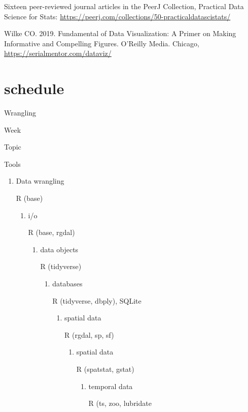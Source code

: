 \documentclass[
]{book}
\begin{document}
Sixteen peer-reviewed journal articles in the PeerJ Collection, Practical Data Science for Stats: \url{https://peerj.com/collections/50-practicaldatascistats/}

Wilke CO. 2019. Fundamental of Data Visualization: A Primer on Making Informative and Compelling Figures. O'Reilly Media. Chicago, \url{https://serialmentor.com/dataviz/}

\hypertarget{schedule}{%
\section{schedule}\label{schedule}}

Wrangling

Week

Topic

Tools

\begin{enumerate}
\def\labelenumi{\arabic{enumi}.}
\item
  Data wrangling

  R (base)

  \begin{enumerate}
  \def\labelenumii{\arabic{enumii}.}
  \setcounter{enumii}{1}
  \item
    i/o

    R (base, rgdal)

    \begin{enumerate}
    \def\labelenumiii{\arabic{enumiii}.}
    \setcounter{enumiii}{2}
    \item
      data objects

      R (tidyverse)

      \begin{enumerate}
      \def\labelenumiv{\arabic{enumiv}.}
      \setcounter{enumiv}{3}
      \item
        databases

        R (tidyverse, dbply), SQLite

        \begin{enumerate}
        \def\labelenumv{\arabic{enumv}.}
        \item
          spatial data

          R (rgdal, sp, sf)

          \begin{enumerate}
          \def\labelenumvi{\arabic{enumvi}.}
          \item
            spatial data

            R (spatstat, gstat)

            \begin{enumerate}
            \def\labelenumvii{\arabic{enumvii}.}
            \item
              temporal data

              R (ts, zoo, lubridate
            \end{enumerate}
          \end{enumerate}
        \end{enumerate}
      \end{enumerate}
    \end{enumerate}
  \end{enumerate}
\end{enumerate}
\end{document}
